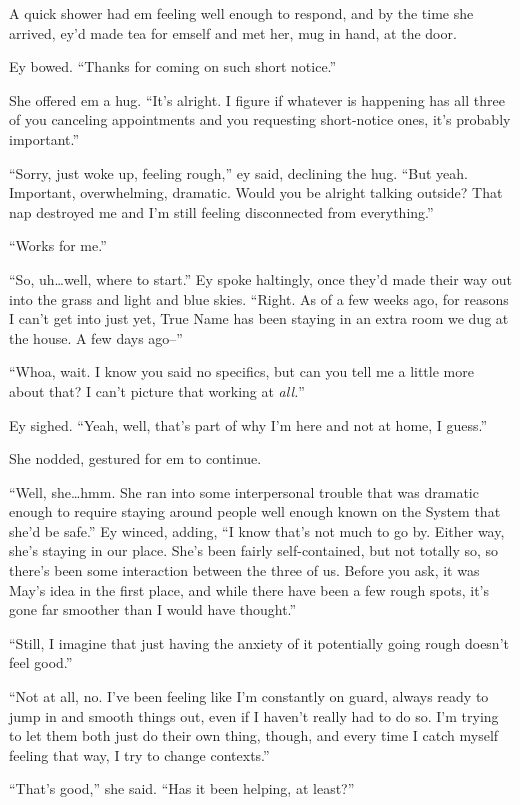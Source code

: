 A quick shower had em feeling well enough to respond, and by the time she arrived, ey'd made tea for emself and met her, mug in hand, at the door.

Ey bowed. ``Thanks for coming on such short notice.''

She offered em a hug. ``It's alright. I figure if whatever is happening has all three of you canceling appointments and you requesting short-notice ones, it's probably important.''

``Sorry, just woke up, feeling rough,'' ey said, declining the hug. ``But yeah. Important, overwhelming, dramatic. Would you be alright talking outside? That nap destroyed me and I'm still feeling disconnected from everything.''

``Works for me.''

``So, uh\ldots well, where to start.'' Ey spoke haltingly, once they'd made their way out into the grass and light and blue skies. ``Right. As of a few weeks ago, for reasons I can't get into just yet, True Name has been staying in an extra room we dug at the house. A few days ago--''

``Whoa, wait. I know you said no specifics, but can you tell me a little more about that? I can't picture that working at \emph{all.}''

Ey sighed. ``Yeah, well, that's part of why I'm here and not at home, I guess.''

She nodded, gestured for em to continue.

``Well, she\ldots hmm. She ran into some interpersonal trouble that was dramatic enough to require staying around people well enough known on the System that she'd be safe.'' Ey winced, adding, ``I know that's not much to go by. Either way, she's staying in our place. She's been fairly self-contained, but not totally so, so there's been some interaction between the three of us. Before you ask, it was May's idea in the first place, and while there have been a few rough spots, it's gone far smoother than I would have thought.''

``Still, I imagine that just having the anxiety of it potentially going rough doesn't feel good.''

``Not at all, no. I've been feeling like I'm constantly on guard, always ready to jump in and smooth things out, even if I haven't really had to do so. I'm trying to let them both just do their own thing, though, and every time I catch myself feeling that way, I try to change contexts.''

``That's good,'' she said. ``Has it been helping, at least?''

